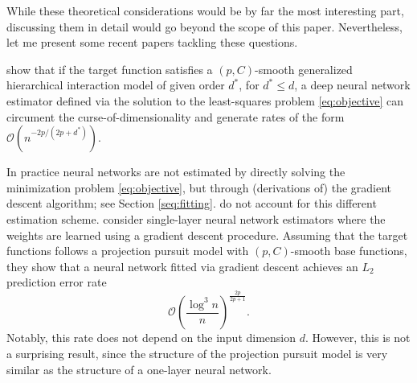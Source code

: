 While these theoretical considerations would be by far the most interesting part,
discussing them in detail would go beyond the scope of this paper. Nevertheless, let me
present some recent papers tackling these questions.

\cite{Bauer.2019} show that if the target function satisfies a $(p, C)$-smooth
generalized hierarchical interaction model of given order $d^\ast$, for $d^\ast \leq d$,
a deep neural network estimator defined via the solution to the least-squares problem
\ref{eq:objective} can circument the curse-of-dimensionality and generate rates of the
form $\mathcal{O}(n^{-{2p}/{(2p + d^\ast)}})$.

In practice neural networks are not estimated by directly solving the minimization
problem \ref{eq:objective}, but through (derivations of) the gradient descent
algorithm; see Section \ref{seq:fitting}. \cite{Bauer.2019} do not account for this
different estimation scheme. \cite{Braun.2019} consider single-layer neural network
estimators where the weights are learned using a gradient descent procedure. Assuming
that the target functions follows a projection pursuit model with $(p, C)$-smooth base
functions, they show that a neural network fitted via gradient descent achieves an
$L_2$ prediction error rate
\[
\mathcal{O}\left(\frac{\log^3 n}{n} \right)^{\frac{2p}{2p + 1}}.
\]
Notably, this rate does not depend on the input dimension $d$. However, this is not
a surprising result, since the structure of the projection pursuit model is very
similar as the structure of a one-layer neural network.
